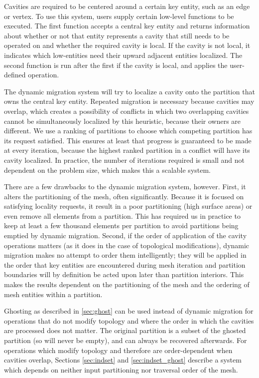 Cavities are required to be centered around a certain key entity,
such as an edge or vertex.
To use this system, users supply certain low-level functions
to be executed.
The first function accepts a central key entity and returns information
about whether or not that entity represents a cavity that still needs
to be operated on and whether the required cavity is local.
If the cavity is not local, it indicates which low-entities need their
upward adjacent entities localized.
The second function is run after the first if the cavity is local,
and applies the user-defined operation.

The dynamic migration system will try to localize a cavity onto the
partition that owns the central key entity.
Repeated migration is necessary because cavities may overlap, which creates
a possibility of conflicts in which two overlapping cavities cannot be simultaneously
localized by this heuristic, because their owners are different.
We use a ranking of partitions to choose which competing partition
has its request satisfied.
This ensures at least that progress is guaranteed to be made at every iteration,
because the highest ranked partition in a conflict will have its cavity localized.
In practice, the number of iterations required is small and not dependent
on the problem size, which makes this a scalable system.

There are a few drawbacks to the dynamic migration system, however.
First, it alters the partitioning of the mesh, often significantly.
Because it is focused on satisfying locality requests, it result in
a poor partitioning (high surface areas) or even remove all elements
from a partition.
This has required us in practice to keep at least a few thousand
elements per partition to avoid partitions being emptied by dynamic migration.
Second, if the order of application of the cavity operations matters
(as it does in the case of topological modifications), dynamic migration
makes no attempt to order them intelligently; they will be applied
in the order that key entities are encountered during mesh iteration
and partition boundaries will by definition be acted upon later than
partition interiors.
This makes the results dependent on the partitioning of the mesh
and the ordering of mesh entities within a partition.

Ghosting as described in \ref{sec:ghost} can be used instead of dynamic
migration for operations that do not modify topology and
where the order in which the cavities
are processed does not matter.
The original partition is a subset of the ghosted partition
(so will never be empty), and can always be recovered afterwards.
For operations which modify topology and therefore are order-dependent
when cavities overlap,
Sections \ref{sec:indset} and \ref{sec:indset_ghost} describe a system
which depends on neither input partitioning nor traversal order of the mesh.

